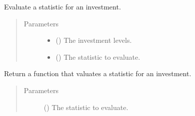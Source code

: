 \documentclass[letterpaper,10pt,english]{sphinxmanual}
\begin{document}
\begin{fulllineitems}

\begin{fulllineitems}
\label{\detokenize{doc-src/tyche:tyche.Evaluator.Evaluator.evaluate_statistic}}
Evaluate a statistic for an investment.
\begin{quote}\begin{description}
\item[{Parameters}] \leavevmode\begin{itemize}
\item {} 
 () \textendash{} The investment levels.

\item {} 
 () \textendash{} The statistic to evaluate.

\end{itemize}

\end{description}\end{quote}

\end{fulllineitems}


\begin{fulllineitems}
\label{\detokenize{doc-src/tyche:tyche.Evaluator.Evaluator.make_statistic_evaluator}}
Return a function that valuates a statistic for an investment.
\begin{quote}\begin{description}
\item[{Parameters}] \leavevmode
{} () \textendash{} The statistic to evaluate.

\end{description}\end{quote}

\end{fulllineitems}


\end{fulllineitems}
\end{document}
